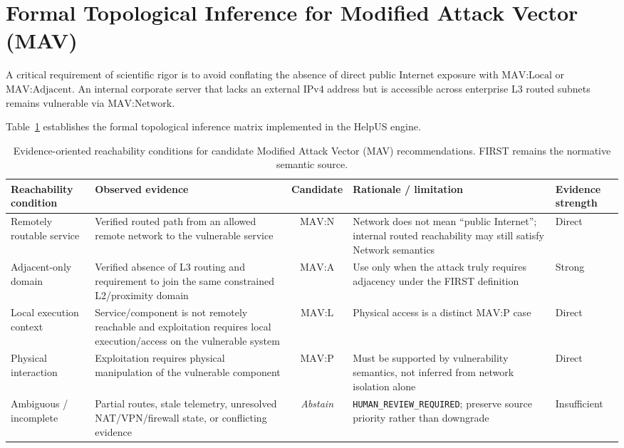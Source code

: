 \section{Formal Topological Inference for Modified Attack Vector (MAV)}
\label{sec:mav_formal_table}
A critical requirement of scientific rigor is to avoid conflating the absence of direct public Internet exposure with $\text{MAV:Local}$ or $\text{MAV:Adjacent}$. An internal corporate server that lacks an external IPv4 address but is accessible across enterprise L3 routed subnets remains vulnerable via $\text{MAV:Network}$.

Table~\ref{tab:mav_inference_matrix} establishes the formal topological inference matrix implemented in the HelpUS engine.

\begin{table}[htbp]
\centering
\small
\caption{Evidence-oriented reachability conditions for candidate Modified Attack Vector (MAV) recommendations. FIRST remains the normative semantic source.}
\label{tab:mav_inference_matrix}
\begin{adjustbox}{max width=\textwidth}
\begin{tabular}{p{2.7cm}p{3.8cm}cp{4.7cm}p{2.1cm}}
\toprule
\textbf{Reachability condition} & \textbf{Observed evidence} & \textbf{Candidate} & \textbf{Rationale / limitation} & \textbf{Evidence strength} \\
\midrule
Remotely routable service & Verified routed path from an allowed remote network to the vulnerable service & $\text{MAV:N}$ & Network does not mean ``public Internet''; internal routed reachability may still satisfy Network semantics & Direct \\
Adjacent-only domain & Verified absence of L3 routing and requirement to join the same constrained L2/proximity domain & $\text{MAV:A}$ & Use only when the attack truly requires adjacency under the FIRST definition & Strong \\
Local execution context & Service/component is not remotely reachable and exploitation requires local execution/access on the vulnerable system & $\text{MAV:L}$ & Physical access is a distinct $\text{MAV:P}$ case & Direct \\
Physical interaction & Exploitation requires physical manipulation of the vulnerable component & $\text{MAV:P}$ & Must be supported by vulnerability semantics, not inferred from network isolation alone & Direct \\
Ambiguous / incomplete & Partial routes, stale telemetry, unresolved NAT/VPN/firewall state, or conflicting evidence & \textit{Abstain} & \texttt{HUMAN\_REVIEW\_REQUIRED}; preserve source priority rather than downgrade & Insufficient \\
\bottomrule
\end{tabular}
\end{adjustbox}
\end{table}

